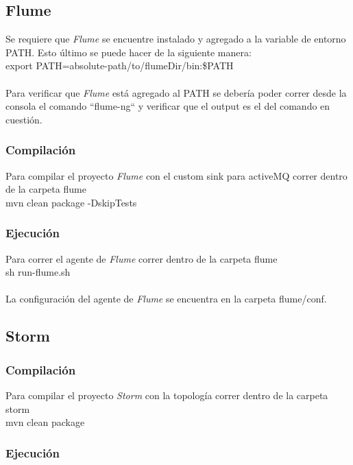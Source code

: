 \documentclass[a4paper,10pt]{article}
\begin{document}
\subsection{Flume}

Se requiere que \textit{Flume} se encuentre instalado y agregado a la variable de entorno PATH.
Esto último se puede hacer de la siguiente manera:
\\

export PATH=absolute-path/to/flumeDir/bin:\$PATH
\\
\\
Para verificar que \textit{Flume} está agregado al PATH se debería poder correr desde la consola el comando ``flume-ng`` y
verificar que el output es el del comando en cuestión.

\subsubsection{Compilación}

Para compilar el proyecto \textit{Flume} con el custom sink para activeMQ correr dentro de la carpeta flume
\\

	mvn clean package -DskipTests

\subsubsection{Ejecución}

Para correr el agente de \textit{Flume} correr dentro de la carpeta flume
\\

	sh run-flume.sh
\\
\\
La configuración del agente de \textit{Flume} se encuentra en la carpeta flume/conf.

\subsection{Storm}

\subsubsection{Compilación}

Para compilar el proyecto \textit{Storm} con la topología correr dentro de la carpeta storm
\\

	mvn clean package

\subsubsection{Ejecución}
\end{document}
